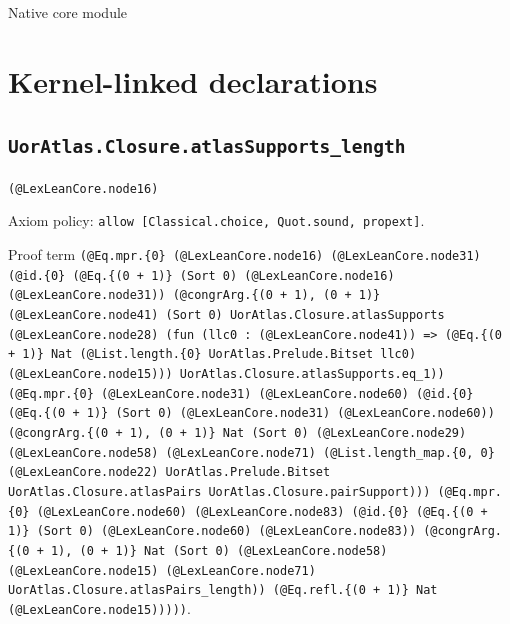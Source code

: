 \documentclass[11pt]{article}
\begin{document}
\begin{center}{\LARGE Native core module}\end{center}
\section*{Kernel-linked declarations}
\subsection*{\texttt{UorAtlas.Closure.atlasSupports\_length}}
\noindent\texttt{(@LexLeanCore.node16)}\par
\noindent Axiom policy: \texttt{allow [Classical.choice, Quot.sound, propext]}.\par
\noindent Proof term \texttt{(@Eq.mpr.\{0\} (@LexLeanCore.node16) (@LexLeanCore.node31) (@id.\{0\} (@Eq.\{(0 + 1)\} (Sort 0) (@LexLeanCore.node16) (@LexLeanCore.node31)) (@congrArg.\{(0 + 1), (0 + 1)\} (@LexLeanCore.node41) (Sort 0) UorAtlas.Closure.atlasSupports (@LexLeanCore.node28) (fun (llc0 : (@LexLeanCore.node41)) => (@Eq.\{(0 + 1)\} Nat (@List.length.\{0\} UorAtlas.Prelude.Bitset llc0) (@LexLeanCore.node15))) UorAtlas.Closure.atlasSupports.eq\_1)) (@Eq.mpr.\{0\} (@LexLeanCore.node31) (@LexLeanCore.node60) (@id.\{0\} (@Eq.\{(0 + 1)\} (Sort 0) (@LexLeanCore.node31) (@LexLeanCore.node60)) (@congrArg.\{(0 + 1), (0 + 1)\} Nat (Sort 0) (@LexLeanCore.node29) (@LexLeanCore.node58) (@LexLeanCore.node71) (@List.length\_map.\{0, 0\} (@LexLeanCore.node22) UorAtlas.Prelude.Bitset UorAtlas.Closure.atlasPairs UorAtlas.Closure.pairSupport))) (@Eq.mpr.\{0\} (@LexLeanCore.node60) (@LexLeanCore.node83) (@id.\{0\} (@Eq.\{(0 + 1)\} (Sort 0) (@LexLeanCore.node60) (@LexLeanCore.node83)) (@congrArg.\{(0 + 1), (0 + 1)\} Nat (Sort 0) (@LexLeanCore.node58) (@LexLeanCore.node15) (@LexLeanCore.node71) UorAtlas.Closure.atlasPairs\_length)) (@Eq.refl.\{(0 + 1)\} Nat (@LexLeanCore.node15)))))}.\par
\end{document}
